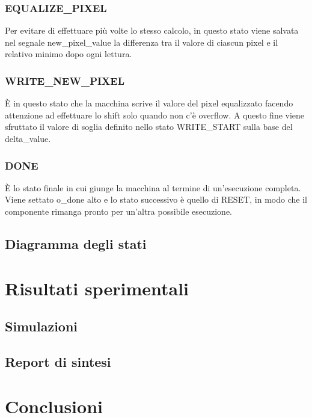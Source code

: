 \documentclass{article}
\begin{document}
\subsubsection{EQUALIZE\_PIXEL}
Per evitare di effettuare più volte lo stesso calcolo, in questo stato viene salvata nel segnale new\_pixel\_value la differenza tra il valore di ciascun pixel e il relativo minimo dopo ogni lettura.

\subsubsection{WRITE\_NEW\_PIXEL}
È in questo stato che la macchina scrive il valore del pixel equalizzato facendo attenzione ad effettuare lo shift solo quando non c'è overflow. A questo fine viene sfruttato il valore di soglia definito nello stato WRITE\_START sulla base del delta\_value.

\subsubsection{DONE}
È lo stato finale in cui giunge la macchina al termine di un'esecuzione completa. Viene settato o\_done alto e lo stato successivo è quello di RESET, in modo che il componente rimanga pronto per un'altra possibile esecuzione.

\subsection{Diagramma degli stati}

\pagebreak
\section{Risultati sperimentali}
\subsection{Simulazioni}
\subsection{Report di sintesi}

\pagebreak
\section{Conclusioni}
\end{document}
